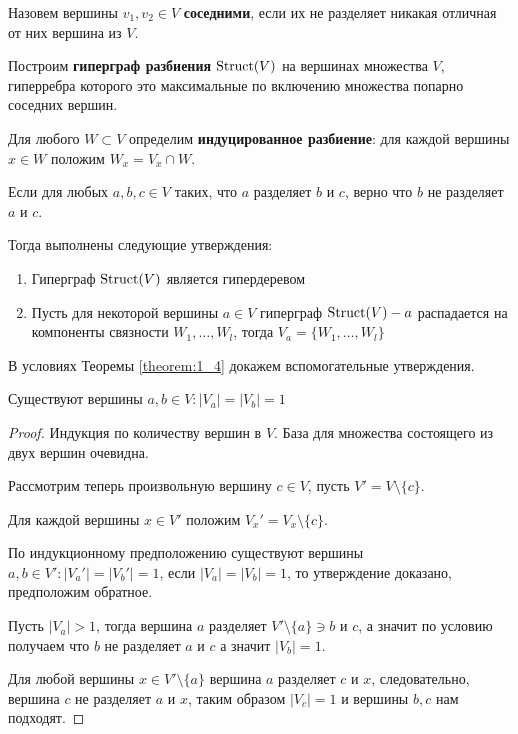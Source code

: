 \documentclass[../main.tex]{subfiles}
\begin{document}
\begin{df*}
	Назовем вершины $v_1,v_2 \in V$ \textbf{соседними}, если их не разделяет никакая отличная от них вершина из $V$.

	Построим \textbf{гиперграф разбиения}  $\operatorname{Struct}(V)$  на вершинах множества $V$, гиперребра которого это максимальные по включению множества попарно соседних вершин.
\end{df*}

\begin{df*}
	Для любого $W \subset V$ определим \textbf{индуцированное разбиение}: для каждой вершины $x \in W$ положим $W_x = V_x \cap W$.
\end{df*}

\begin{customthm}{1.4} \label{theorem:1_4}
	Если для любых $a, b, c \in V$ таких, что  $a$ разделяет $b$ и $c$, верно что  $b$ не разделяет $a$ и $c$.

	Тогда выполнены следующие утверждения:

	\begin{enumerate}
		\item Гиперграф $\operatorname{Struct}(V)$ является гипердеревом
		\item Пусть для некоторой вершины $a \in V$ гиперграф $\operatorname{Struct}(V) - a$ распадается на компоненты связности $W_1, \ldots, W_l$, тогда $V_a = \{W_1, \ldots, W_l\}$
	\end{enumerate}
\end{customthm}

В условиях Теоремы \ref{theorem:1_4} докажем вспомогательные утверждения.

\begin{customclaim}{1.1} \label{claim:1_1}
	Существуют вершины $a, b \in V \colon |V_a| = |V_b| = 1$
\end{customclaim}

\begin{proof}
	Индукция по количеству вершин в $V$. База для множества состоящего из двух вершин очевидна. 

	Рассмотрим теперь произвольную вершину $c \in V$, пусть  $V' = V \setminus\{c\}$.

	Для каждой вершины $x \in V'$ положим $V_x' = V_x \setminus \{c\}$.

	По индукционному предположению существуют вершины $a, b \in V' \colon |V_a'| = |V_b'| = 1$, если  $|V_a| = |V_b| = 1$, то утверждение доказано, предположим обратное.

	Пусть  $|V_a| > 1$, тогда вершина  $a$ разделяет $V' \setminus \{a\} \ni b$ и  $c$, а значит по условию получаем что $b$ не разделяет $a$ и $c$ а значит $|V_b| = 1$.

	Для любой вершины  $x \in V' \setminus \{a\}$ вершина $a$ разделяет $c$ и $x$, следовательно, вершина  $c$ не разделяет $a$ и $x$, таким образом $|V_c| = 1$ и вершины $b, c$ нам подходят. 
\end{proof}
\end{document}
